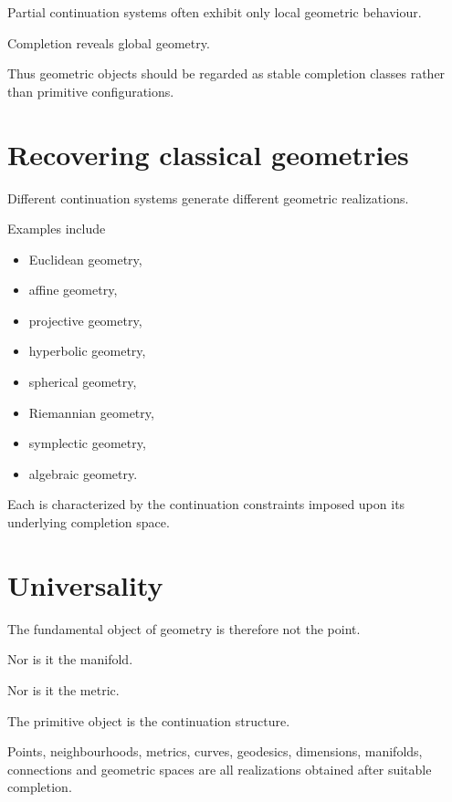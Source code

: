 \documentclass[13pt,openany]{book}
\theoremstyle{plain}
\theoremstyle{definition}
\begin{document}
Partial continuation systems often exhibit only local geometric behaviour.

Completion reveals global geometry.

Thus geometric objects should be regarded as stable completion classes rather
than primitive configurations.

\section{Recovering classical geometries}

Different continuation systems generate different geometric realizations.

Examples include

\begin{itemize}
\item Euclidean geometry,
\item affine geometry,
\item projective geometry,
\item hyperbolic geometry,
\item spherical geometry,
\item Riemannian geometry,
\item symplectic geometry,
\item algebraic geometry.
\end{itemize}

Each is characterized by the continuation constraints imposed upon its
underlying completion space.

\section{Universality}

The fundamental object of geometry is therefore not the point.

Nor is it the manifold.

Nor is it the metric.

The primitive object is the continuation structure.

Points, neighbourhoods, metrics, curves, geodesics, dimensions, manifolds,
connections and geometric spaces are all realizations obtained after suitable
completion.
\end{document}
